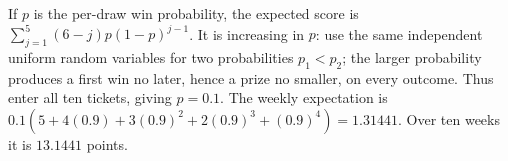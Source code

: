 If $p$ is the per-draw win probability, the expected score is $\sum_{j=1}^5(6-j)p(1-p)^{j-1}$. It is increasing in $p$: use the same independent uniform random variables for two probabilities $p_1<p_2$; the larger probability produces a first win no later, hence a prize no smaller, on every outcome. Thus enter all ten tickets, giving $p=0.1$. The weekly expectation is $0.1(5+4(0.9)+3(0.9)^2+2(0.9)^3+(0.9)^4)=1.31441$. Over ten weeks it is $\boxed{13.1441}$ points.
